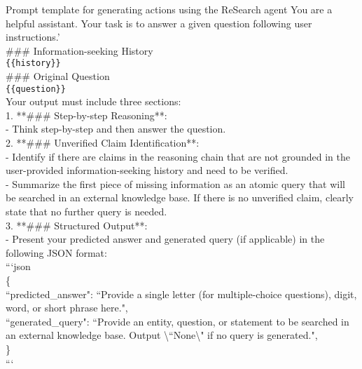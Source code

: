 \begin{figure*}[h]
\begin{AIbox}{Prompt template for generating actions using the ReSearch agent}
You are a helpful assistant. Your task is to answer a given question following user instructions.'\\

\#\#\# Information-seeking History\\
\verb|{{history}}|\\

\#\#\# Original Question\\
\verb|{{question}}|\\

Your output must include three sections:\\
1. **\#\#\# Step-by-step Reasoning**:\\
  - Think step-by-step and then answer the question.\\

2. **\#\#\# Unverified Claim Identification**:\\
  - Identify if there are claims in the reasoning chain that are not grounded in the user-provided information-seeking history and need to be verified.\\
  - Summarize the first piece of missing information as an atomic query that will be searched in an external knowledge base. If there is no unverified claim, clearly state that no further query is needed.\\

3. **\#\#\# Structured Output**:\\
  - Present your predicted answer and generated query (if applicable) in the following JSON format:\\
    ```json\\
    \{\\
        ``predicted\_answer": ``Provide a single letter (for multiple-choice questions), digit, word, or short phrase here.",\\
        ``generated\_query": ``Provide an entity, question, or statement to be searched in an external knowledge base. Output \textbackslash``None\textbackslash" if no query is generated.",\\
    \}\\
    ```
\end{AIbox}
\caption{Template used to generate actions for the ReSearch agent.}
\label{fig:prompt_research}
\end{figure*}


